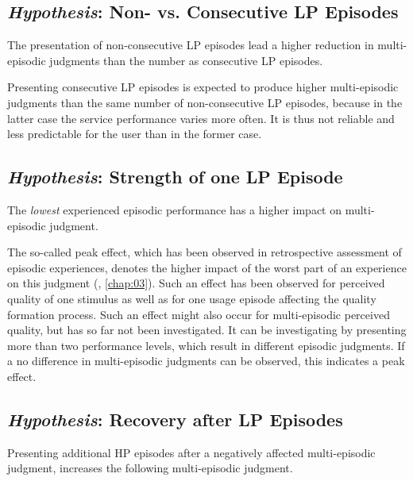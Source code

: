 \subsection{\emph{Hypothesis}: Non- vs. Consecutive \acs{LP} Episodes}
\begin{hypothesis}\label{hypo:consecutive}
The presentation of non-consecutive \ac{LP} episodes lead a higher reduction in multi-episodic judgments than the number as consecutive \ac{LP} episodes.
\end{hypothesis}

Presenting consecutive \ac{LP} episodes is expected to produce higher multi-episodic judgments than the same number of non-consecutive \ac{LP} episodes, because in the latter case the service performance varies more often.
It is thus not reliable and less predictable for the user than in the former case.

\subsection{\emph{Hypothesis}: Strength of one \acs{LP} Episode}
\begin{hypothesis}\label{hypo:strength}
The \emph{lowest} experienced episodic performance has a higher impact on multi-episodic judgment.
\end{hypothesis}

The so-called peak effect, which has been observed in retrospective assessment of episodic experiences, denotes the higher impact of the worst part of an experience on this judgment (\cf, \autoref{chap:03}).
Such an effect has been observed for perceived quality of one stimulus as well as for one usage episode affecting the quality formation process.
Such an effect might also occur for multi-episodic perceived quality, but has so far not been investigated.
It can be investigating by presenting more than two performance levels, which result in different episodic judgments.
If a no difference in multi-episodic judgments can be observed, this indicates a peak effect.

\subsection{\emph{Hypothesis}: Recovery after \acs{LP} Episodes}
\begin{hypothesis}\label{hypo:recovery}
Presenting additional \ac{HP} episodes after a negatively affected multi-episodic judgment, increases the following multi-episodic judgment.
\end{hypothesis}

